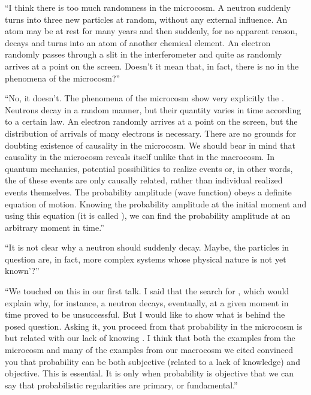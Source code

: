 \begin{dialogue}

\rdr ``I think there is too much randomness in the microcosm.
A neutron suddenly turns into three new particles at random, without
any external influence. An atom may be at rest for many years and
then suddenly, for no apparent reason, decays and turns into an atom
of another chemical element. An electron randomly passes through
a slit in the interferometer and quite as randomly arrives at a point
on the screen. Doesn't it mean that, in fact, there is no  in the phenomena of the microcosm?''

\athr ``No, it doesn't. The phenomena of the microcosm show
very explicitly the . Neutrons decay in a random manner, but their quantity varies in time
according to a certain law. An electron randomly arrives at a point on
the screen, but the distribution of arrivals of many electrons is
necessary. There are no grounds for doubting existence of causality in
the microcosm. We should bear in mind that causality in the
microcosm reveals itself unlike that in the macrocosm. In quantum
mechanics, potential possibilities to realize events or, in other words,
the  of these events are only causally related, rather than individual realized events themselves. The probability amplitude (wave function) obeys a definite equation of motion. Knowing the
probability amplitude at the initial moment and using this equation (it
is called ), we can find the probability amplitude at an arbitrary moment in time.''

\rdr ``It is not clear why a neutron should suddenly decay.
Maybe, the particles in question are, in fact, more complex systems
whose physical nature is not yet known'?''

\athr ``We touched on this in our first talk. I said that the search
for , which would explain why, for instance,
a neutron decays, eventually, at a given moment in time proved to be
unsuccessful. But I would like to show what is behind the posed
question. Asking it, you proceed from that probability in the
microcosm is  but related with our lack of knowing . I think that both the examples from the microcosm and many of the examples from our macrocosm we cited convinced you that probability can be both subjective (related to a lack of knowledge) and objective. This is essential. It is only when probability is objective that we can say that probabilistic regularities are primary, or fundamental.''


\end{dialogue}
